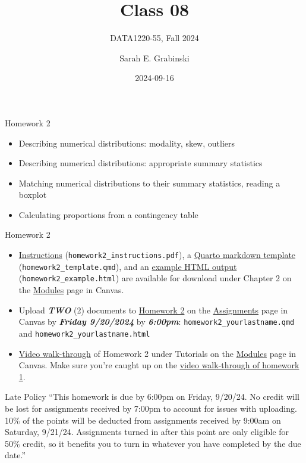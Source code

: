 \documentclass[
  ignorenonframetext,
]{beamer}
\title{Class 08}
\subtitle{DATA1220-55, Fall 2024}
\author{Sarah E. Grabinski}
\date{2024-09-16}
\begin{document}
\frame{\titlepage}

\begin{frame}{Homework 2}
\label{homework-2}
\begin{itemize}
\item
  Describing numerical distributions: modality, skew, outliers
\item
  Describing numerical distributions: appropriate summary statistics
\item
  Matching numerical distributions to their summary statistics, reading
  a boxplot
\item
  Calculating proportions from a contingency table
\end{itemize}
\end{frame}

\begin{frame}[fragile]{Homework 2}
\label{homework-2-1}
\begin{itemize}
\item
  \href{https://canvas.jcu.edu/files/3708401/download?download_frd=1}{Instructions}
  (\texttt{homework2\_instructions.pdf}), a
  \href{https://canvas.jcu.edu/files/3708307/download?download_frd=1}{Quarto
  markdown template} (\texttt{homework2\_template.qmd}), and an
  \href{https://canvas.jcu.edu/files/3708306/download?download_frd=1}{example
  HTML output} (\texttt{homework2\_example.html}) are available for
  download under Chapter 2 on the
  \href{https://canvas.jcu.edu/courses/36290/modules}{Modules} page in
  Canvas.
\item
  Upload \textbf{\emph{TWO}} (2) documents to
  \href{https://canvas.jcu.edu/courses/36290/assignments/451733}{Homework
  2} on the
  \href{https://canvas.jcu.edu/courses/36290/assignments}{Assignments}
  page in Canvas by \textbf{\emph{Friday 9/20/2024}} by
  \textbf{\emph{6:00pm}}: \texttt{homework2\_yourlastname.qmd} and
  \texttt{homework2\_yourlastname.html}
\item
  \href{https://canvas.jcu.edu/files/3708369/download?download_frd=1}{Video
  walk-through} of Homework 2 under Tutorials on the
  \href{https://canvas.jcu.edu/courses/36290/modules}{Modules} page in
  Canvas. Make sure you're caught up on the
  \href{https://canvas.jcu.edu/files/3695568/download?download_frd=1}{video
  walk-through of homework 1}.
\end{itemize}
\end{frame}

\begin{frame}{Late Policy}
\label{late-policy}
``This homework is due by 6:00pm on Friday, 9/20/24. No credit will be
lost for assignments received by 7:00pm to account for issues with
uploading. 10\% of the points will be deducted from assignments received
by 9:00am on Saturday, 9/21/24. Assignments turned in after this point
are only eligible for 50\% credit, so it benefits you to turn in
whatever you have completed by the due date.''
\end{frame}
\end{document}
